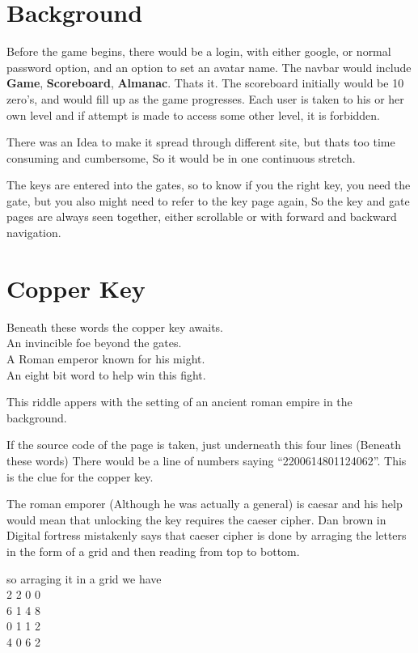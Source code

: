 \documentclass[12pt]{article}
\begin{document}
\section{Background}
Before the game begins, there would be a login, with either google, or normal password option, and an option to set an avatar name. The navbar would include \textbf{Game}, \textbf{Scoreboard}, \textbf{Almanac}. Thats it. The scoreboard initially would be 10 zero's, and would fill up as the game progresses. Each user is taken to his or her own level and if attempt is made to access some other level, it is forbidden.

There was an Idea to make it spread through different site, but thats too time consuming and cumbersome, So it would be in one continuous stretch.

The keys are entered into the gates, so to know if you the right key, you need the gate, but you also might need to refer to the key page again, So the key and gate pages are always seen together, either scrollable or with forward and backward navigation.
\section{Copper Key}
\begin{centering}
Beneath these words the copper key awaits. \\
An invincible foe beyond the gates.\\
A Roman emperor known for his might.\\
An eight bit word to help win this fight.\\
\end{centering}

This riddle appers with the setting of an ancient roman empire in the background. 

If the source code of the page is taken, just underneath this four lines (Beneath these words) There would be a line of numbers saying ``2200614801124062''. This is the clue for the copper key. 

The roman emporer (Although he was actually a general) is caesar and his help would mean that unlocking the key requires the caeser cipher. Dan brown in Digital fortress mistakenly says that caeser cipher is done by arraging the letters in the form of a grid and then reading from top to bottom.

so arraging it in a grid we have\\
2 2 0 0\\
6 1 4 8\\
0 1 1 2\\
4 0 6 2\\
\end{document}
